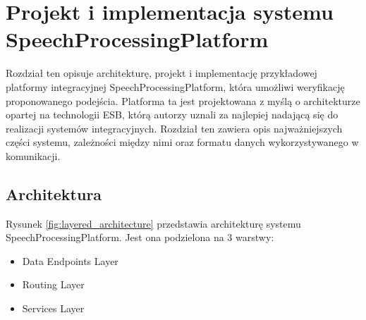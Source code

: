 
\chapter{Projekt i implementacja systemu SpeechProcessingPlatform} %



\ifpdf
    \graphicspath{{6/figures/PNG/}{6/figures/PDF/}{6/figures/}}
\else
    \graphicspath{{6/figures/EPS/}{6/figures/}}
\fi


Rozdział ten opisuje architekturę, projekt i implementację przykładowej platformy integracyjnej SpeechProcessingPlatform, która umożliwi weryfikację proponowanego podejścia. Platforma ta jest projektowana z myślą o architekturze opartej na technologii ESB, którą autorzy uznali za najlepiej nadającą się do realizacji systemów integracyjnych. Rozdział ten zawiera opis najważniejszych części systemu, zależności między nimi oraz formatu danych wykorzystywanego w komunikacji.

\section{Architektura}

Rysunek \ref{fig:layered_architecture} przedstawia architekturę systemu SpeechProcessingPlatform. Jest ona podzielona na 3 warstwy:

\begin{itemize}
	\item Data Endpoints Layer
	\item Routing Layer
	\item Services Layer
\end{itemize}

